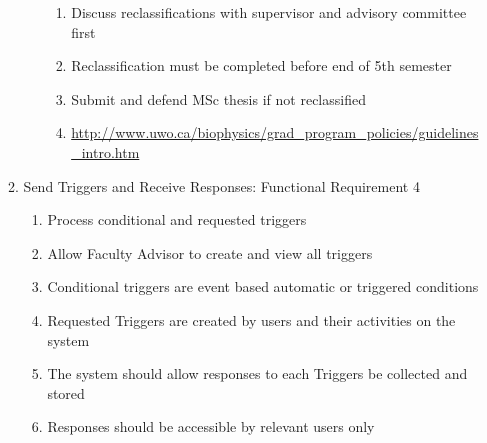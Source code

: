 \documentclass{journal}
\begin{document}
\begin{enumerate}
\begin{enumerate}
\begin{enumerate}
\begin{enumerate}
\item Discuss reclassifications with supervisor and advisory committee first
\item Reclassification must be completed before end of 5th semester
\item Submit and defend MSc thesis if not reclassified
\item \url{http://www.uwo.ca/biophysics/grad\_program\_policies/guidelines\_intro.htm}
\end{enumerate}
\end{enumerate}
\item Send Triggers and Receive Responses: Functional Requirement 4
\begin{enumerate}
\item Process conditional and requested triggers
\item Allow Faculty Advisor to create and view all triggers
\item Conditional triggers are event based automatic or triggered conditions
\item Requested Triggers are created by users and their activities on the system
\item The system should allow responses to each Triggers be collected and stored
\item Responses should be accessible by relevant users only 
\end{enumerate}
\end{enumerate}
\end{enumerate}
\end{document}
